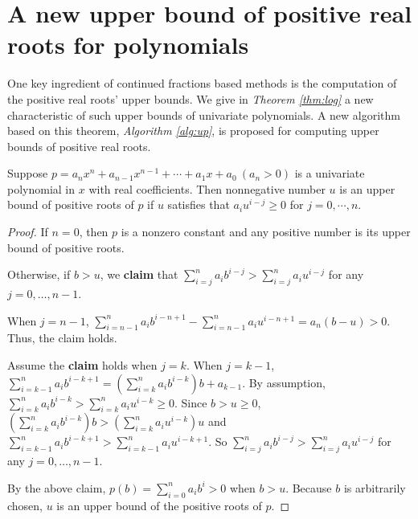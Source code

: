 
\section{A new upper bound of positive real roots for polynomials}
\label{sec:thm}

One key ingredient of continued fractions based methods is the computation of  the positive real roots' upper bounds. We give in {\em Theorem \ref{thm:log}} a new characteristic of such upper bounds of univariate polynomials. A new algorithm based on this theorem, {\em Algorithm \ref{alg:up}}, is proposed for computing upper bounds of positive real roots.


\begin{theorem}
	\label{thm:log}
  Suppose   $p=a_nx^n+a_{n-1}x^{n-1}+\cdots+a_1x+a_0\ (a_n>0)$  is a univariate polynomial in $x$ with real coefficients.  Then  nonnegative number $u$ is an upper bound of positive roots of $p$ if $u$   satisfies that  $a_i u^{i-j}\ge 0$ for $j=0,\cdots, n $.
\end{theorem}
\begin{proof}
  If $n=0$, then $p$ is a nonzero constant and any positive number is its upper bound of positive roots.

  Otherwise, if $b>u$,  we {\bf claim} that $\sum_{i=j}^na_ib^{i-j}> \sum_{i=j}^na_iu^{i-j}$ for any $j= 0,\ldots,n-1$.

  When $j=n-1$, $\sum_{i=n-1}^na_ib^{i-n+1}-\sum_{i=n-1}^na_iu^{i-n+1}=a_n(b-u)>0.$ Thus, the claim holds.

  Assume the {\bf claim} holds  when $j=k$. When $j=k-1$,  $\sum_{i=k-1}^na_ib^{i-k+1}=\left(\sum_{i=k}^na_ib^{i-k}\right)b+a_{k-1} $. By assumption,
  $\sum_{i=k}^na_ib^{i-k}>\sum_{i=k}^na_iu^{i-k}\ge0$. Since $b>u\ge0$, $\left(\sum_{i=k}^na_ib^{i-k}\right)b>\left (\sum_{i=k}^na_iu^{i-k} \right)u  $
  and $\sum_{i=k-1}^na_ib^{i-k+1}> \sum_{i=k-1}^na_iu^{i-k+1}$. So  $\sum_{i=j}^na_ib^{i-j}> \sum_{i=j}^na_iu^{i-j}$ for any $j= 0,\ldots,n-1$.


  By the above claim,   $p(b)=\sum_{i=0}^na_ib^i>0$ when  $b>u$. Because $b$ is arbitrarily chosen, $u$ is an upper bound of the positive roots of $p$.

\end{proof}

